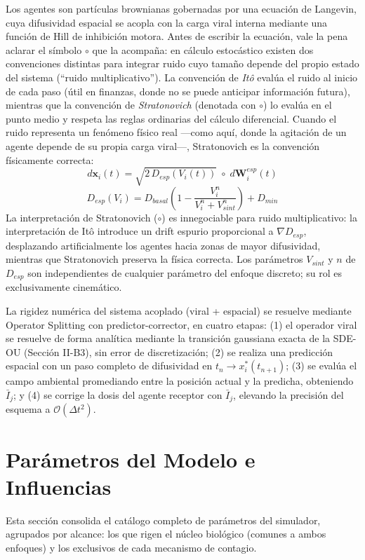 \documentclass[conference]{IEEEtran}
\begin{document}
Los agentes son partículas brownianas gobernadas por una ecuación de Langevin, cuya difusividad espacial se acopla con la carga viral interna mediante una función de Hill de inhibición motora. Antes de escribir la ecuación, vale la pena aclarar el símbolo $\circ$ que la acompaña: en cálculo estocástico existen dos convenciones distintas para integrar ruido cuyo tamaño depende del propio estado del sistema (``ruido multiplicativo''). La convención de \emph{Itô} evalúa el ruido al inicio de cada paso (útil en finanzas, donde no se puede anticipar información futura), mientras que la convención de \emph{Stratonovich} (denotada con $\circ$) lo evalúa en el punto medio y respeta las reglas ordinarias del cálculo diferencial. Cuando el ruido representa un fenómeno físico real ---como aquí, donde la agitación de un agente depende de su propia carga viral---, Stratonovich es la convención físicamente correcta:
\begin{equation}
d\mathbf{x}_i(t) = \sqrt{2\, D_{esp}(V_i(t))}\; \circ\; d\mathbf{W}_i^{esp}(t)
\end{equation}
\begin{equation}
D_{esp}(V_i) = D_{basal}\left(1 - \frac{V_i^n}{V_i^n + V_{sint}^n}\right) + D_{min}
\end{equation}
La interpretación de Stratonovich ($\circ$) es innegociable para ruido multiplicativo: la interpretación de Itô introduce un drift espurio proporcional a $\nabla D_{esp}$, desplazando artificialmente los agentes hacia zonas de mayor difusividad, mientras que Stratonovich preserva la física correcta. Los parámetros $V_{sint}$ y $n$ de $D_{esp}$ son independientes de cualquier parámetro del enfoque discreto; su rol es exclusivamente cinemático.

La rigidez numérica del sistema acoplado (viral + espacial) se resuelve mediante Operator Splitting con predictor-corrector, en cuatro etapas: (1) el operador viral se resuelve de forma analítica mediante la transición gaussiana exacta de la SDE-OU (Sección II-B3), sin error de discretización; (2) se realiza una predicción espacial con un paso completo de difusividad en $t_n \to x_i^*(t_{n+1})$; (3) se evalúa el campo ambiental promediando entre la posición actual y la predicha, obteniendo $\bar{I}_j$; y (4) se corrige la dosis del agente receptor con $\bar{I}_j$, elevando la precisión del esquema a $\mathcal{O}(\Delta t^2)$.

\section{Parámetros del Modelo e Influencias}
Esta sección consolida el catálogo completo de parámetros del simulador, agrupados por alcance: los que rigen el núcleo biológico (comunes a ambos enfoques) y los exclusivos de cada mecanismo de contagio.
\end{document}
